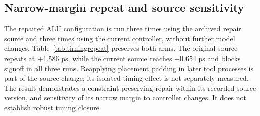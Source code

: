 \subsection{Narrow-margin repeat and source sensitivity}
The repaired ALU configuration is run three times using the archived repair
source and three times using the current controller, without further model
changes. Table~\ref{tab:timingrepeat} preserves both arms. The original source
repeats at +1.586 ps, while the current source reaches $-0.654$ ps and blocks
signoff in all three runs. Reapplying placement padding in later tool processes
is part of the source change; its isolated timing effect is not separately
measured. The result demonstrates a constraint-preserving repair within its
recorded source version, and sensitivity of its narrow margin to controller
changes. It does not establish robust timing closure.

